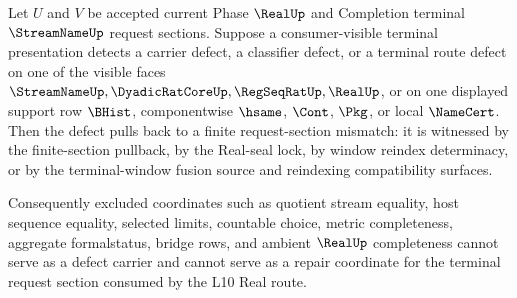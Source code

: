 \begin{theorem}
\label{thm:streamname-terminal-support-defect-pullback}
Let $U$ and $V$ be accepted current Phase $\RealUp$ and Completion terminal
$\StreamNameUp$ request sections. Suppose a consumer-visible terminal
presentation detects a carrier defect, a classifier defect, or a terminal
route defect on one of the visible faces
$\StreamNameUp,\DyadicRatCoreUp,\RegSeqRatUp,\RealUp$, or on one displayed
support row $\BHist$, componentwise $\hsame$, $\Cont$, $\Pkg$, or local
$\NameCert$. Then the defect pulls back to a finite request-section mismatch:
it is witnessed by the finite-section pullback, by the Real-seal lock, by
window reindex determinacy, or by the terminal-window fusion source and
reindexing compatibility surfaces.

Consequently excluded coordinates such as quotient stream equality, host
sequence equality, selected limits, countable choice, metric completeness,
aggregate formalstatus, bridge rows, and ambient $\RealUp$ completeness cannot
serve as a defect carrier and cannot serve as a repair coordinate for the
terminal request section consumed by the L10 Real route.
\end{theorem}
